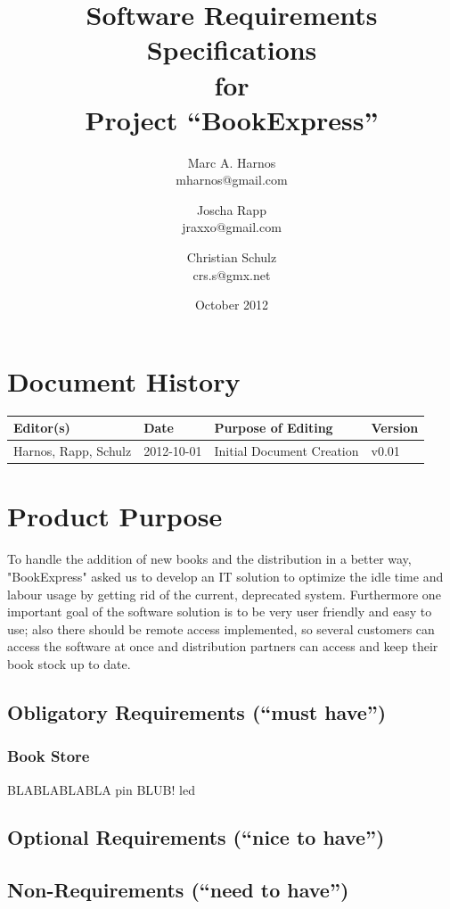\documentclass[11pt,a4paper,oneside,svgnames]{report}
\begin{document}
\title{Software Requirements Specifications\\ for\\ Project ``BookExpress''}
\author{Marc A. Harnos\\ {mharnos@gmail.com} \and Joscha Rapp\\ {jraxxo@gmail.com} \and Christian Schulz\\ {crs.s@gmx.net}}
\date{October 2012}
\maketitle
\tableofcontents

\chapter*{Document History}
\begin{tabular}{|l|l|l|l|}
\hline 
Editor(s) & Date & Purpose of Editing & Version \\ 
\hline 
Harnos, Rapp, Schulz & 2012-10-01 & Initial Document Creation & v0.01 \\ 
\hline 
\end{tabular} 

\chapter{Product Purpose}
To handle the addition of new books and the distribution in a better way, "BookExpress" asked us to develop an IT solution to optimize the idle time and labour usage by getting rid of the current, deprecated system. Furthermore one important goal of the software solution is to be very user friendly and easy to use; also there should be remote access implemented, so several customers can access the software at once and distribution partners can access and keep their book stock up to date.
\section{Obligatory Requirements (``must have'')}
\subsection{Book Store}
BLABLABLABLA \gls{pin} BLUB! \gls{led}
\section{Optional Requirements (``nice to have'')}
\section{Non-Requirements (``need to have'')}
\end{document}

